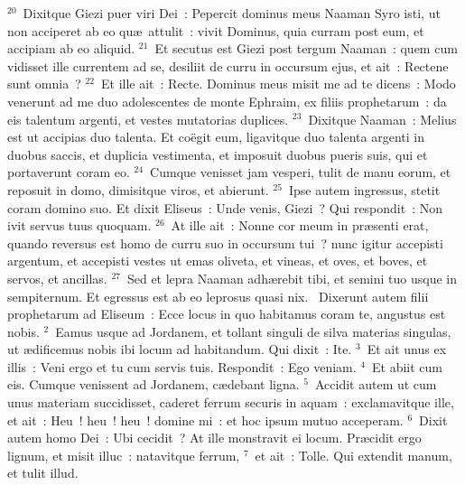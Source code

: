 ${}^{20}$~Dixitque Giezi puer viri Dei~: Pepercit dominus meus Naaman Syro isti, ut non acciperet ab eo qu\ae\ attulit~: vivit Dominus, quia curram post eum, et accipiam ab eo aliquid.
${}^{21}$~Et secutus est Giezi post tergum Naaman~: quem cum vidisset ille currentem ad se, desiliit de curru in occursum ejus, et ait~: Rectene sunt omnia~?
${}^{22}$~Et ille ait~: Recte. Dominus meus misit me ad te dicens~: Modo venerunt ad me duo adolescentes de monte Ephraim, ex filiis prophetarum~: da eis talentum argenti, et vestes mutatorias duplices.
${}^{23}$~Dixitque Naaman~: Melius est ut accipias duo talenta. Et co\"egit eum, ligavitque duo talenta argenti in duobus saccis, et duplicia vestimenta, et imposuit duobus pueris suis, qui et portaverunt coram eo.
${}^{24}$~Cumque venisset jam vesperi, tulit de manu eorum, et reposuit in domo, dimisitque viros, et abierunt.
${}^{25}$~Ipse autem ingressus, stetit coram domino suo. Et dixit Eliseus~: Unde venis, Giezi~? Qui respondit~: Non ivit servus tuus quoquam.
${}^{26}$~At ille ait~: Nonne cor meum in pr\ae senti erat, quando reversus est homo de curru suo in occursum tui~? nunc igitur accepisti argentum, et accepisti vestes ut emas oliveta, et vineas, et oves, et boves, et servos, et ancillas.
${}^{27}$~Sed et lepra Naaman adh\ae rebit tibi, et semini tuo usque in sempiternum. Et egressus est ab eo leprosus quasi nix.
~\lettrine[lines=10,image=true,loversize=0.05,lraise=-0.03]{D}{}ixerunt autem filii prophetarum ad Eliseum~: Ecce locus in quo habitamus coram te, angustus est nobis.
${}^{2}$~Eamus usque ad Jordanem, et tollant singuli de silva materias singulas, ut \ae dificemus nobis ibi locum ad habitandum. Qui dixit~: Ite.
${}^{3}$~Et ait unus ex illis~: Veni ergo et tu cum servis tuis. Respondit~: Ego veniam.
${}^{4}$~Et abiit cum eis. Cumque venissent ad Jordanem, c\ae debant ligna.
${}^{5}$~Accidit autem ut cum unus materiam succidisset, caderet ferrum securis in aquam~: exclamavitque ille, et ait~: Heu~! heu~! heu~! domine mi~: et hoc ipsum mutuo acceperam.
${}^{6}$~Dixit autem homo Dei~: Ubi cecidit~? At ille monstravit ei locum. Pr\ae cidit ergo lignum, et misit illuc~: natavitque ferrum,
${}^{7}$~et ait~: Tolle. Qui extendit manum, et tulit illud.


